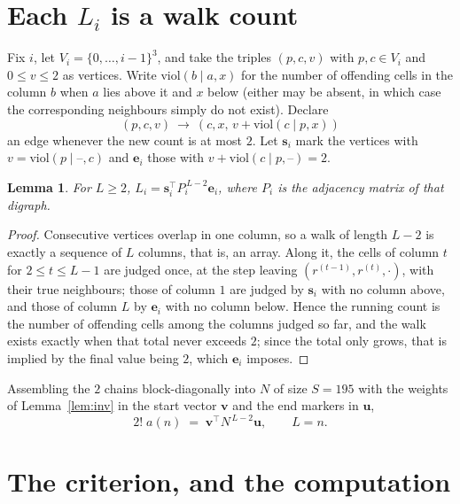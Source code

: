\documentclass[11pt,a4paper]{article}
\theoremstyle{plain}
\newtheorem{lemma}[theorem]{Lemma}
\theoremstyle{definition}
\begin{document}
\section{Each $L_i$ is a walk count}

Fix $i$, let $V_i=\{0,\dots,i-1\}^{3}$, and take the triples $(p,c,v)$ with
$p,c\in V_i$ and $0\le v\le2$ as vertices. Write $\mathrm{viol}(b\mid a,x)$ for the number
of offending cells in the column $b$ when $a$ lies above it and $x$ below (either may be
absent, in which case the corresponding neighbours simply do not exist). Declare
\[
(p,c,v)\ \longrightarrow\ (c,x,\,v+\mathrm{viol}(c\mid p,x))
\]
an edge whenever the new count is at most $2$. Let $\mathbf{s}_i$ mark the vertices with
$v=\mathrm{viol}(p\mid\text{--},c)$ and $\mathbf{e}_i$ those with
$v+\mathrm{viol}(c\mid p,\text{--})=2$.

\begin{lemma}\label{lem:walk}
For $L\ge2$, $L_i=\mathbf{s}_i^{\!\top}P_i^{\,L-2}\mathbf{e}_i$, where $P_i$ is the
adjacency matrix of that digraph.
\end{lemma}

\begin{proof}
Consecutive vertices overlap in one column, so a walk of length $L-2$ is exactly a sequence
of $L$ columns, that is, an array. Along it, the cells of column $t$ for $2\le t\le L-1$ are
judged once, at the step leaving $(r^{(t-1)},r^{(t)},\cdot)$, with their true neighbours;
those of column $1$ are judged by $\mathbf{s}_i$ with no column above, and those of column
$L$ by $\mathbf{e}_i$ with no column below. Hence the running count is the number of
offending cells among the columns judged so far, and the walk exists exactly when that total
never exceeds $2$; since the total only grows, that is implied by the final value being
$2$, which $\mathbf{e}_i$ imposes.
\end{proof}

Assembling the $2$ chains block-diagonally into $N$ of size $S=195$ with the weights of
Lemma~\ref{lem:inv} in the start vector $\mathbf{v}$ and the end markers in
$\mathbf{u}$,
\begin{equation}\label{eq:walk2}
2!\;a(n)\;=\;\mathbf{v}^{\!\top}N^{\,L-2}\mathbf{u},\qquad L=n .
\end{equation}

\section{The criterion, and the computation}
\end{document}
